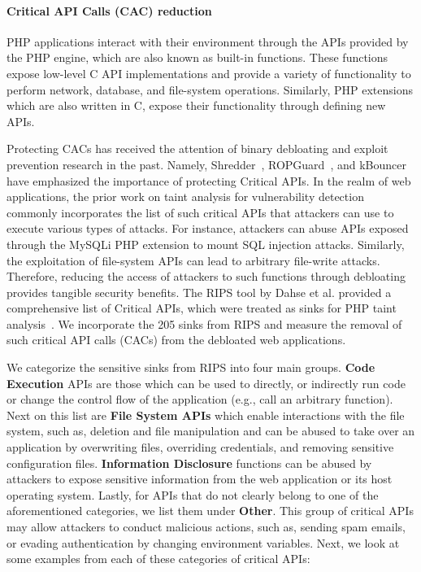 \paragraph{Critical API Calls (CAC) reduction} 
PHP applications interact with their environment through the APIs provided by the PHP engine, which are also known as built-in functions. 
These functions expose low-level C API implementations and provide a variety of functionality to perform network, database, and file-system operations. 
Similarly, PHP extensions which are also written in C, expose their functionality through defining new APIs. 

Protecting CACs has received the attention of binary debloating and exploit prevention research in the past. 
Namely, Shredder~\cite{mishra2018shredder}, ROPGuard~\cite{fratric2012ropguard}, and kBouncer~\cite{pappas2012kbouncer} have emphasized the importance of protecting Critical APIs. 
In the realm of web applications, the prior work on taint analysis for vulnerability detection commonly incorporates the list of such critical APIs that attackers can use to execute various types of attacks. 
For instance, attackers can abuse APIs exposed through the MySQLi PHP extension to mount SQL injection attacks. 
Similarly, the exploitation of file-system APIs can lead to arbitrary file-write attacks. 
Therefore, reducing the access of attackers to such functions through debloating provides tangible security benefits. The RIPS tool by Dahse et al. provided a comprehensive list of Critical APIs, which were treated as sinks for PHP taint analysis~\cite{dahse2010rips}. 
We incorporate the 205 sinks from RIPS and measure the removal of such critical API calls (CACs) from the debloated web applications. 

We categorize the sensitive sinks from RIPS into four main groups. \textbf{Code Execution} APIs are those which can be used to directly, or indirectly run code or change the control flow of the application (e.g., call an arbitrary function). 
Next on this list are \textbf{File System APIs} which enable interactions with the file system, such as, deletion and file manipulation and can be abused to take over an application by overwriting files, overriding credentials, and removing sensitive configuration files. 
\textbf{Information Disclosure} functions can be abused by attackers to expose sensitive information from the web application or its host operating system. 
Lastly, for APIs that do not clearly belong to one of the aforementioned categories, we list them under \textbf{Other}. 
This group of critical APIs may allow attackers to conduct malicious actions, such as, sending spam emails, or evading authentication by changing environment variables. 
Next, we look at some examples from each of these categories of critical APIs: 

